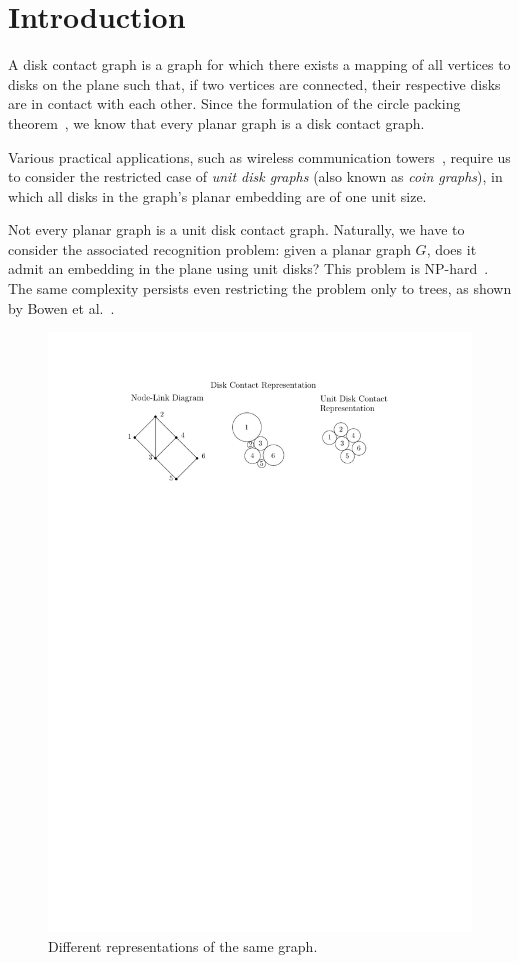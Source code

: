 
\chapter{Introduction}

A disk contact graph is a graph for which there exists a mapping of all vertices to disks on the plane such that, if two vertices are connected, their respective disks are in contact with each other.
Since the formulation of the circle packing theorem~\cite{Koebe1936}, we know that every planar graph is a disk contact graph.

Various practical applications, such as wireless communication towers~\cite{Hale1980}, require us to consider the restricted case of \emph{unit disk graphs} (also known as \emph{coin graphs}), in which all disks in the graph's planar embedding are of one unit size.

Not every planar graph is a unit disk contact graph. Naturally, we have to consider the associated recognition problem: given a planar graph $G$, does it admit an embedding in the plane using unit disks? 
This problem is NP-hard~\cite{Breu1998}. The same complexity persists even restricting the problem only to trees, as shown by Bowen et al.~\cite{Bowen2015}.

\begin{figure}
    \centering
    \includegraphics{graphics/ch1_introduction.pdf}
    \caption{Different representations of the same graph.}
    \label{fig:ch1_introduction}
\end{figure}

